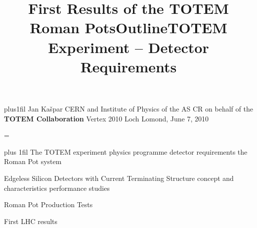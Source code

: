 







\def\Bref#1{Ref\hbox{. }\bref{#1}}
\def\comment#1{}

\def\fg{\cmyk{\FgColor}}
\def\fgt{\cmyk{\TitColor}}
\def\blue{\rgb{\0.5 0.5 0.9}}
\def\green{\rgb{0.5 0.9 0.5}}
\def\red{\rgb{0.9 0.5 0.5}}
\def\yellow{\rgb{0.9 0.9 0}}

\def\date{June 7, 2010}


\newpage %
\hbox{}\vfil
\title{\bPxx First Results of the TOTEM Roman Pots}
\baselineskip
\bgroup
		\obeylines{} plus1fil
		{\bPxv Jan Ka\v spar}
		CERN and Institute of Physics of the AS CR
		on behalf of the {\bf TOTEM Collaboration}
		\baselineskip
		Vertex 2010
		Loch Lomond, \date
\egroup

\baselineskip

\footline={}

\newpage %
\title{Outline}

\vfil
\vskip-1cm

\bgroup
\def\tit#1{\vskip1cm{\bPxii #1}}
\obeylines
{} plus 1fil
\tit{The TOTEM experiment}
physics programme
detector requirements
the Roman Pot system

\tit{Edgeless Silicon Detectors}
{\bPxii with Current Terminating Structure}
concept and characteristics
performance studies

\tit{Roman Pot Production Tests}

\tit{First LHC results} 
\egroup

\vfil

\newpage %
\title{TOTEM Experiment -- Detector Requirements}

\vfil

\bgroup
{}


